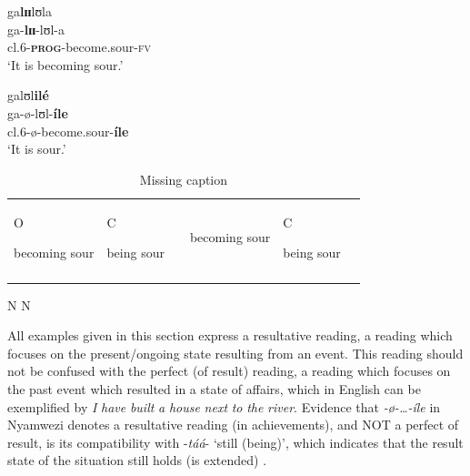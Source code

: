 \documentclass[output=paper,newtxmath,modfonts,nonflat,draftmode]{langsci/langscibook}
\begin{document}
\ea \label{ex:kanijo:16}
    \ea 
    \glll ga\textbf{lɪɪ}lʊla\\
    ga-\textbf{lɪɪ}-lʊl-a\\
    cl.6-\textbf{\textsc{prog}}-become.sour-\textsc{fv}\\
    \glt ‘It is becoming sour.’
    
    \ex 
    \glll galʊl\textbf{ilé}\\
    ga-ø-lʊl-\textbf{íle}\\
    cl.6-ø-become.sour-\textbf{íle}\\
    \glt ‘It is sour.’
    
    \z
\z
    
\begin{table}
\begin{tabularx}{\textwidth}{XXXXXX}
\lsptoprule
\hhline{--~~--}
 O\par


becoming sour & C\par

being sour &  & %

 becoming sour & C\par

\par

 being sour\\
\hhline{--~~--}
\end{tabularx}
                N             N 
\caption{{\color{red} Missing caption}}                
\end{table} 

                
All examples given in this section express a resultative reading, a reading which focuses on the present/ongoing state resulting from an event. This reading should not be confused with the perfect (of result) reading, a reading which focuses on the past event which resulted in a state of affairs, which in English can be exemplified by \textit{I} \textit{have} \textit{built} \textit{a} \textit{house} \textit{next} \textit{to} \textit{the} \textit{river}. Evidence that \textit{-ø}\textit{-…-íle} in Nyamwezi denotes a resultative reading (in achievements), and NOT a perfect of result, is its compatibility with -\textit{táá}- ‘still (being)’, which indicates that the result state of the situation still holds (is extended) . 
\end{document}
